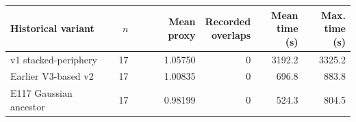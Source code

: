 \begin{tabular}{lrrrrr}
\toprule
Historical variant & $n$ & Mean proxy & \shortstack{Recorded\\overlaps} & \shortstack{Mean\\time (s)} & \shortstack{Max.\\time (s)} \\
\midrule
v1 stacked-periphery & 17 & 1.05750 & 0 & 3192.2 & 3325.2 \\
Earlier V3-based v2 & 17 & 1.00835 & 0 & 696.8 & 883.8 \\
E117 Gaussian ancestor & 17 & 0.98199 & 0 & 524.3 & 804.5 \\
\bottomrule
\end{tabular}
